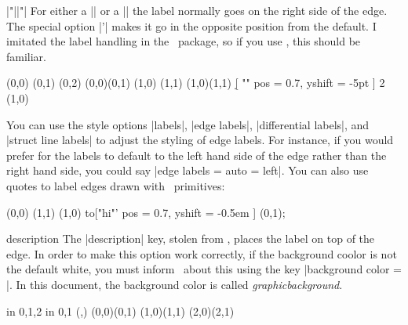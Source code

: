 \begin{sseqdata}[name = basic, cohomological Serre grading]
\begin{manualentry}{|"||"|}
For either a |\structline| or a |\class| the label normally goes on the right side of the edge. The special option |'| makes it go in the opposite position from the default. I imitated the label handling in the \tikzcdpkg\ package, so if you use \tikzcdpkg, this should be familiar.
\begin{codeexample}[width = 6cm]
\begin{sseqpage}[ Adams grading, yscale = 0.63 ]
\class(0,0)
\class(0,1)
\class(0,2)
\structline["a"' blue](0,0)(0,1)
\class(1,0)
\class(1,1)
\structline["b"](1,0)(1,1)
\d[ "" { pos = 0.7, yshift = -5pt } ] 2 (1,0)
\end{sseqpage}
\end{codeexample}
You can use the style options |labels|, |edge labels|, |differential labels|, and |struct line labels| to adjust the styling of edge labels. For instance, if you would prefer for the labels to default to the left hand side of the edge rather than the right hand side, you could say |edge labels = {auto = left}|.
You can also use quotes to label edges drawn with \tikzpkg\ primitives:
\begin{codeexample}[width = 6cm]
\begin{sseqpage}[ yscale = 0.58, no axes ]
\class(0,0)
\class(1,1)
\draw (1,0) to["hi"'{ pos = 0.7, yshift = -0.5em }] (0,1);
\end{sseqpage}
\end{codeexample}

\begin{key}{description}
The |description| key, stolen from \tikzcdpkg, places the label on top of the edge. In order to make this option work correctly, if the background coolor is not the default white, you must inform \sseqpages\ about this using the key |background color = |. In this document, the background color is called \textit{graphicbackground}.
\begin{codeexample}[width = 6cm]
\begin{sseqpage}[ no axes, background color = graphicbackground ]
\foreach \x in {0,1,2} \foreach \y in {0,1} {
    \class(\x,\y)
}
\structline["a" red](0,0)(0,1)
\structline["a'"'blue,"b"{yshift = 1em}](1,0)(1,1)
\structline["c" description](2,0)(2,1)
\end{sseqpage}
\end{codeexample}
\end{key}
\end{manualentry}




\end{sseqdata}
